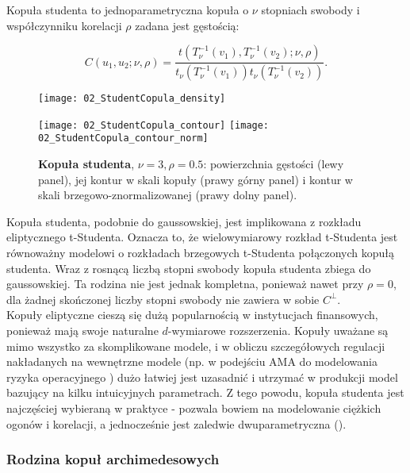 \begin{df}
	Kopuła studenta to jednoparametryczna kopuła o $\nu$ stopniach swobody i współczynniku korelacji $\rho$ zadana jest gęstością:
	
	$$ C(u_1, u_2;\nu,\rho) = \frac{t(T_{\nu}^{-1}(v_1), T_{\nu}^{-1}(v_2);\nu,\rho)}{t_{\nu}(T_{\nu}^{-1}(v_1))t_{\nu}(T_{\nu}^{-1}(v_2))}.$$
\end{df}
\begin{figure}[h]
	\centering
	\begin{minipage}{0.5\linewidth}
		\texttt{[image: 02\_StudentCopula\_density]}
	\end{minipage}
	\begin{minipage}{0.45\linewidth}
		\texttt{[image: 02\_StudentCopula\_contour]}
		\texttt{[image: 02\_StudentCopula\_contour\_norm]}
	\end{minipage}
	\caption{\textbf{Kopuła studenta}, $\nu=3, \rho=0.5$: powierzchnia gęstości (lewy panel), jej kontur w skali kopuły (prawy górny panel) i kontur w skali brzegowo-znormalizowanej (prawy dolny panel). \label{fig:student_copula_density}}
\end{figure}
Kopuła studenta, podobnie do gaussowskiej, jest implikowana z rozkładu eliptycznego t-Studenta. Oznacza to, że wielowymiarowy rozkład t-Studenta jest równoważny modelowi o rozkładach brzegowych t-Studenta połączonych kopułą studenta. Wraz z rosnącą liczbą stopni swobody kopuła studenta zbiega do gaussowskiej. Ta rodzina nie jest jednak kompletna, ponieważ nawet przy $\rho=0$, dla żadnej skończonej liczby stopni swobody nie zawiera w sobie $C^{\perp}$.\\

Kopuły eliptyczne cieszą się dużą popularnością w instytucjach finansowych, ponieważ mają swoje naturalne $d$-wymiarowe rozszerzenia. Kopuły uważane są mimo wszystko za skomplikowane modele, i w obliczu szczegółowych regulacji nakładanych na wewnętrzne modele (np. w podejściu AMA do modelowania ryzyka operacyjnego \cite{BaselII}) dużo łatwiej jest uzasadnić i utrzymać w produkcji model bazujący na kilku intuicyjnych parametrach. Z tego powodu, kopuła studenta jest najczęściej wybieraną w praktyce - pozwala bowiem na modelowanie ciężkich ogonów i korelacji, a jednocześnie jest zaledwie dwuparametryczna (\cite{OpRisk}).\\

\subsubsection{Rodzina kopuł archimedesowych}

